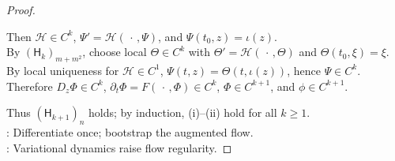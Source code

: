 \begin{theorem}
\begin{proof}
\begin{enumerate}[label=(\roman*)]
Then $\mathcal H\in C^k$, $\Psi'=\mathcal H(\,\cdot\,,\Psi)$, and $\Psi(t_0,z)=\iota(z)$.\\
By $(\mathsf H_k)_{m+m^2}$, choose local $\Theta\in C^k$ with $\Theta'=\mathcal H(\,\cdot\,,\Theta)$ and $\Theta(t_0,\xi)=\xi$.\\
By local uniqueness for $\mathcal H\in C^1$, $\Psi(t,z)=\Theta(t,\iota(z))$, hence $\Psi\in C^k$.\\
Therefore $D_z\Phi\in C^k$, $\partial_t\Phi=F(\,\cdot\,,\Phi)\in C^k$, $\Phi\in C^{k+1}$, and $\phi\in C^{k+1}$.
\end{enumerate}
Thus $(\mathsf H_{k+1})_n$ holds; by induction, (i)--(ii) hold for all $k\geq1$.\\
: Differentiate once; bootstrap the augmented flow.\\
: Variational dynamics raise flow regularity.
\end{proof}
\end{theorem}

